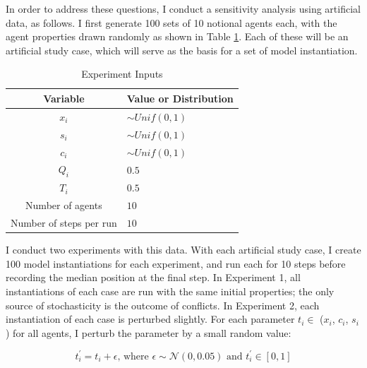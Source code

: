 In order to address these questions, I conduct a sensitivity analysis using artificial data, as follows. I first generate 100 sets of 10 notional agents each, with the agent properties drawn randomly as shown in Table \ref{table:sa_params}. Each of these will be an artificial study case, which will serve as the basis for a set of model instantiation. 

\begin{table}
\centering
\caption{Experiment Inputs}
\label{table:sa_params}
\begin{tabular}{cl}
    \hline
    Variable &  Value or Distribution\\
    \hline
    $x_i$            &        $\sim Unif(0, 1)$  \\
    $s_i$            &        $\sim Unif(0, 1)$          \\
    $c_i$            &        $\sim Unif(0, 1)$        \\
    $Q_i$            &   $0.5$ \\
    $T_i$            &   $0.5$ \\
    \hline
    Number of agents &        $10$ \\
    Number of steps per run &        $10$ \\
    \hline
\end{tabular}
\tableSpace
\end{table}

I conduct two experiments with this data. With each artificial study case, I create 100 model instantiations for each experiment, and run each for 10 steps before recording the median position at the final step. In Experiment 1, all instantiations of each case are run with the same initial properties; the only source of stochasticity is the outcome of conflicts. In Experiment 2, each instantiation of each case is perturbed slightly. For each parameter $t_i \in$ ($x_i$, $c_i$, $s_i$) for all agents, I perturb the parameter by a small random value:

\begin{equation}
    t_i^\prime = t_i + \epsilon \text{, where } \epsilon \sim \mathcal{N}(0,0.05) \text{ and } t_i^\prime \in {[0,1]} 
\end{equation}


